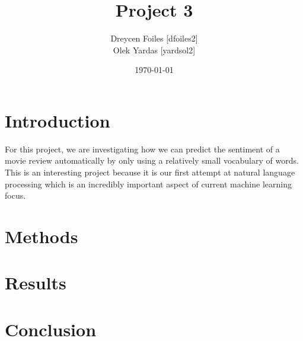 \documentclass{article}
\title{Project 3}
\author{Dreycen Foiles [dfoiles2] \\ Olek Yardas [yardsol2]}
\date{\today}
\begin{document}
\maketitle

\section{Introduction}

For this project, we are investigating how we can predict the sentiment of a movie review automatically by only using a relatively small vocabulary of words. This is an interesting project because it is our first attempt at natural language processing which is an incredibly important aspect of current machine learning focus. 

\section{Methods}

\section{Results}

\section{Conclusion}
\end{document}
